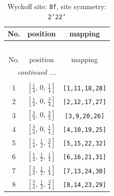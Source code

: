\documentclass[fleqn,8pt]{jsarticle}
\begin{document}
\begin{longtable}{ccc}
\caption{Wyckoff site: {\tt 8f}, site symmetry: {\tt 2'22'}}
 \\
 \hline \hline
No. & position & mapping \\ \hline \endfirsthead

\multicolumn{2}{l}{\tablename\ \thetable{}} \\
 \hline \hline
No. & position & mapping \\ \hline \endhead

 \hline \hline
\multicolumn{2}{r}{\footnotesize\it continued ...} \\ \endfoot

 \hline \hline
\multicolumn{2}{r}{} \\ \endlastfoot

1 & $\left[ \frac{1}{4},\, 0,\, \frac{1}{4} \right]$ & {\tt [1,11,18,28]} \\ \hline
2 & $\left[ \frac{1}{4},\, 0,\, \frac{3}{4} \right]$ & {\tt [2,12,17,27]} \\ \hline
3 & $\left[ \frac{3}{4},\, 0,\, \frac{3}{4} \right]$ & {\tt [3,9,20,26]} \\ \hline
4 & $\left[ \frac{3}{4},\, 0,\, \frac{1}{4} \right]$ & {\tt [4,10,19,25]} \\ \hline
5 & $\left[ \frac{1}{4},\, \frac{1}{2},\, \frac{3}{4} \right]$ & {\tt [5,15,22,32]} \\ \hline
6 & $\left[ \frac{1}{4},\, \frac{1}{2},\, \frac{1}{4} \right]$ & {\tt [6,16,21,31]} \\ \hline
7 & $\left[ \frac{3}{4},\, \frac{1}{2},\, \frac{1}{4} \right]$ & {\tt [7,13,24,30]} \\ \hline
8 & $\left[ \frac{3}{4},\, \frac{1}{2},\, \frac{3}{4} \right]$ & {\tt [8,14,23,29]} \\
\end{longtable}
\renewcommand{\arraystretch}{1.2}
\end{document}
